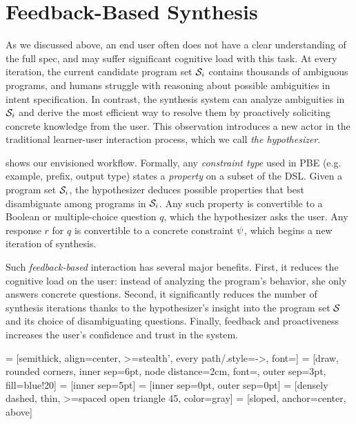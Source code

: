 \section{Feedback-Based Synthesis}
\label{sec:interactive:feedback}

As we discussed above, an end user often does not have a clear understanding of the full spec, and may suffer
significant cognitive load with this task.
At every iteration, the current candidate program set $\mathcal{S}_i$ contains thousands of ambiguous programs, and humans
struggle with reasoning about possible ambiguities in intent specification.
In contrast, the synthesis system can analyze ambiguities in $\mathcal{S}_i$ and derive the most efficient way to resolve them
by proactively soliciting concrete knowledge from the user.
This observation introduces a new actor in the traditional learner-user interaction process, which we call \emph{the
hypothesizer}.

 shows our envisioned workflow.
Formally, any \emph{constraint type} used in PBE (e.g. example, prefix, output type) states a \emph{property} on a
subset of the DSL.
Given a program set $\mathcal{S}_i$, the hypothesizer deduces possible properties that best disambiguate among programs in
$\mathcal{S}_i$.
Any such property is convertible to a Boolean or multiple-choice question $q$, which the hypothesizer asks the user.
Any response $r$ for $q$ is convertible to a concrete constraint $\psi$, which begins a new iteration of
synthesis.

Such \emph{feedback-based} interaction has several major benefits.
First, it reduces the cognitive load on the user: instead of analyzing the program's behavior, she only answers concrete
questions.
Second, it significantly reduces the number of synthesis iterations thanks to the hypothesizer's insight into the
program set $\mathcal{S}$ and its choice of disambiguating questions.
Finally, feedback and proactiveness increases the user's confidence and trust in the system.

 = [semithick, align=center, >=stealth', every path/.style={->, font=\small}]
 = [draw, rounded corners, inner sep=6pt, node distance=2cm, font=\sffamily, outer sep=3pt,
                     fill=blue!20]
 = [inner sep=5pt]
 = [inner sep=0pt, outer sep=0pt]
 = [densely dashed, thin, >=spaced open triangle 45, color=gray]
 = [sloped, anchor=center, above]

